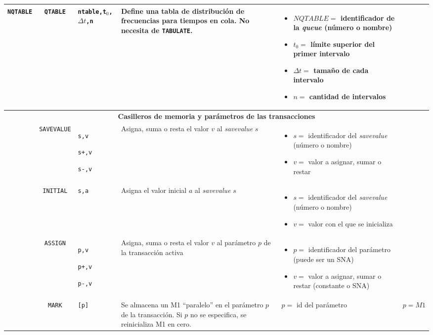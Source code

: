 \documentclass{article}
\providecommand{\tabularnewline}{\\}
\begin{document}
\begin{longtable}{|lc>{\raggedright}p{}|>{\raggedright}p{}|>{\raggedright}p{}|>{\raggedright}p{}|}
\hline
\texttt{NQTABLE} & \texttt{QTABLE} & \texttt{ntable,t$_{0}$,$\Delta t$,n} &
Define una tabla de distribución de frecuencias para tiempos en cola. No necesita de \texttt{TABULATE}. &
\begin{itemize}
  \item $NQTABLE=$ identificador de la \emph{queue} (número o nombre)
  \item $t_{0}=$ límite superior del primer intervalo
  \item $\Delta t=$ tamaño de cada intervalo
  \item $n=$ cantidad de intervalos
\end{itemize} & \tabularnewline

\hline
\multicolumn{6}{c}{\textbf{Casilleros de memoria y parámetros de las transacciones}} \tabularnewline

\hline
& \texttt{SAVEVALUE} &
\texttt{s,v}

\texttt{s+,v}

\texttt{s-,v} &
Asigna, suma o resta el valor $v$ al \emph{savevalue} $s$ &
\begin{itemize}
  \item $s=$ identificador del \emph{savevalue} (número o nombre)
  \item $v=$ valor a asignar, sumar o restar
\end{itemize} & \tabularnewline

\hline
& \texttt{INITIAL} & \texttt{s,a} &
Asigna el valor inicial $a$ al \emph{savevalue} $s$ &
\begin{itemize}
  \item $s=$ identificador del \emph{savevalue} (número o nombre)
  \item $v=$ valor con el que se inicializa
\end{itemize} & \tabularnewline

\hline
& \texttt{ASSIGN} &
\texttt{p,v}

\texttt{p+,v}

\texttt{p-,v} &
Asigna, suma o resta el valor $v$ al parámetro $p$ de la transacción activa &

\begin{itemize}
  \item $p=$ identificador del parámetro (puede ser un SNA)
  \item $v=$ valor a asignar, sumar o restar (constante o SNA)
\end{itemize} & \tabularnewline

\hline
& \texttt{MARK} & \texttt{[p]} &
Se almacena un M1 ``paralelo'' en el parámetro $p$ de la transacción.
Si $p$ no se especifica, se reinicializa M1 en cero. &
$p=$ id del parámetro & $p=M1$ \tabularnewline


\end{longtable}
\end{document}
